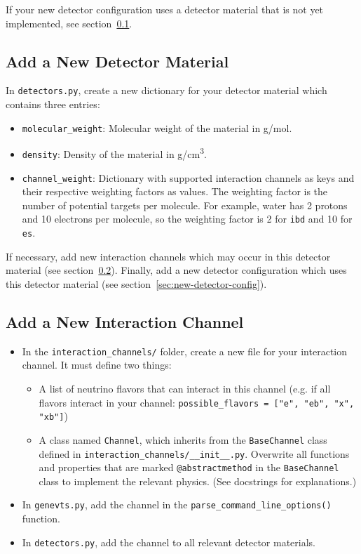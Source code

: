 \documentclass[11pt, oneside]{article}
\begin{document}
If your new detector configuration uses a detector material that is not yet implemented, see section~\ref{sec:new-detector-material}.

\subsection{Add a New Detector Material}\label{sec:new-detector-material}

In \texttt{detectors.py}, create a new dictionary for your detector material which contains three entries:
\begin{itemize}
\item \texttt{molecular\_weight}: Molecular weight of the material in \si{g/mol}.
\item \texttt{density}: Density of the material in \si{g/cm^3}.
\item \texttt{channel\_weight}: Dictionary with supported interaction channels as keys and their respective weighting factors as values. The weighting factor is the number of potential targets per molecule. For example, water has 2 protons and 10 electrons per molecule, so the weighting factor is 2 for \texttt{ibd} and 10 for \texttt{es}.
\end{itemize}

If necessary, add new interaction channels which may occur in this detector material (see section~\ref{sec:new-interaction-channel}).
Finally, add a new detector configuration which uses this detector material (see section~\ref{sec:new-detector-config}).

\subsection{Add a New Interaction Channel}\label{sec:new-interaction-channel}

\begin{itemize}
\item In the \texttt{interaction\_channels/} folder, create a new file for your interaction channel. It must define two things:
	\begin{itemize}
		\item A list of neutrino flavors that can interact in this channel (e.g. if all flavors interact in your channel: \texttt{possible\_flavors = ["e", "eb", "x", "xb"]})
		\item A class named \texttt{Channel}, which inherits from the \texttt{BaseChannel} class defined in \texttt{interaction\_channels/\_\_init\_\_.py}. Overwrite all functions and properties that are marked \texttt{@abstractmethod} in the \texttt{BaseChannel} class to implement the relevant physics.
		(See docstrings for explanations.)
	\end{itemize}
\item In \texttt{genevts.py}, add the channel in the \texttt{parse\_command\_line\_options()} function.
\item In \texttt{detectors.py}, add the channel to all relevant detector materials.
\end{itemize}
\end{document}
